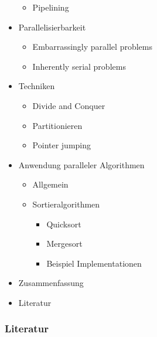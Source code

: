 \begin{frame}[allowframebreaks]
\begin{itemize}
\begin{itemize}
                \item Pipelining
            \end{itemize}
        \item Parallelisierbarkeit
            \begin{itemize}
                \item Embarrassingly parallel problems
                \item Inherently serial problems
            \end{itemize}
        \item Techniken
            \begin{itemize}
                \item Divide and Conquer
                \item Partitionieren
                \item Pointer jumping
            \end{itemize}
        \framebreak
        \item Anwendung paralleler Algorithmen
            \begin{itemize}
                \item Allgemein
                \item Sortieralgorithmen
                    \begin{itemize}
                        \item Quicksort
                        \item Mergesort
                        \item Beispiel Implementationen
                    \end{itemize}
            \end{itemize}
        \item Zusammenfassung
        \item Literatur
    \end{itemize}
\nocite{*}
\end{frame}



\begin{frame}[allowframebreaks]
\frametitle{Literatur}
    \printbibliography   
\end{frame}


